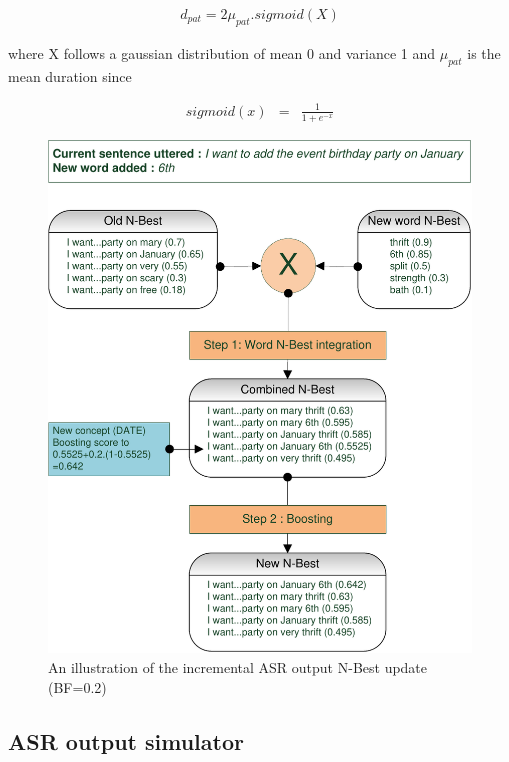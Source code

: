 					\begin{eqnarray}
						d_{pat} = 2 \mu_{pat}.sigmoid(X)
					\end{eqnarray}
					
					where X follows a gaussian distribution of mean 0 and variance 1 and $\mu_{pat}$ is the mean duration since
					
					\begin{eqnarray}
						sigmoid(x) & = & \frac{1}{1 + e^{-x}}
					\end{eqnarray}
					
					
					\begin{figure}[h]
					\centering
					\includegraphics[scale=0.75]{figures/ASRSimu.pdf}
					\caption{An illustration of the incremental ASR output N-Best update (BF=0.2)}
					\label{fig:asrsimu}
				\end{figure}
					
	\subsection{ASR output simulator}
			
